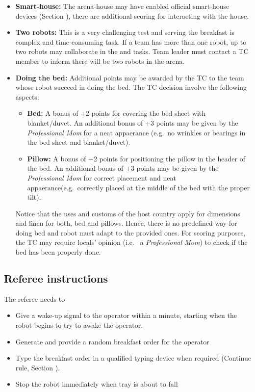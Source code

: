 \begin{itemize}
	\item \textbf{Smart-house:} The arena-house may have enabled official smart-house devices (Section ), there are additional scoring for interacting with the house.

	\item \textbf{Two robots:} This is a very challenging test and serving the breakfast is complex and time-consuming task. If a team has more than one robot, up to two robots may collaborate in the  and  tasks. Team leader must contact a TC member to inform there will be two robots in the arena.

	\item \textbf{Doing the bed:} Additional points may be awarded by the TC to the team whose robot succeed in doing the bed. The TC decision involve the following aspects:
	\begin{itemize}
		\item \textbf{Bed:} A bonus of +2 points for covering the bed sheet with blanket/duvet. An additional bonus of +3 points may be given by the \textit{Professional Mom} for a neat appaerance (e.g.~no wrinkles or bearings in the bed sheet and blanket/duvet).
		\item \textbf{Pillow:} A bonus of +2 points for positioning the pillow in the header of the bed. An additional bonus of +3 points may be given by the \textit{Professional Mom} for correct placement and neat appaerance(e.g.~correctly placed at the middle of the bed with the proper tilt).
	\end{itemize}
	Notice that the uses and customs of the host country apply for dimensions and linen for both, bed and pillows. Hence, there is no predefined way for doing bed and robot must adapt to the provided ones. For scoring purposes, the TC may require locals' opinion (i.e.~ a \textit{Professional Mom}) to check if the bed has been properly done.
\end{itemize}

\subsection{Referee instructions}

The referee needs to
\begin{itemize}
	\item Give a wake-up signal to the operator within a minute, starting when the robot begins to try to awake the operator.
	\item Generate and provide a random breakfast order for the operator
	\item Type the breakfast order in a qualified typing device when required (Continue rule, Section ).
	\item Stop the robot immediately when tray is about to fall
\end{itemize}


